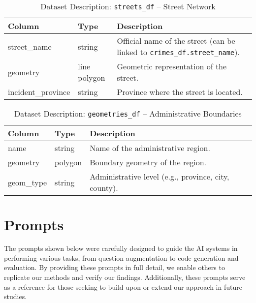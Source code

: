 \begin{table}[H]
\centering
\scriptsize
\begin{tabular}{|l|l|p{8cm}|}
  \hline
  \textbf{Column} & \textbf{Type} & \textbf{Description} \\
\hline
street\_name & string & Official name of the street (can be linked to \texttt{crimes\_df.street\_name}). \\
geometry & line polygon & Geometric representation of the street. \\
incident\_province & string & Province where the street is located. \\
\hline
\end{tabular}
\caption{Dataset Description: \texttt{streets\_df} – Street Network}
\end{table}


\begin{table}[H]
\centering
\scriptsize
\begin{tabular}{|l|l|p{8cm}|}
  \hline
  \textbf{Column} & \textbf{Type} & \textbf{Description} \\
  \hline
name & string & Name of the administrative region. \\
geometry & polygon & Boundary geometry of the region. \\
geom\_type & string & Administrative level (e.g., province, city, county). \\
\hline
\end{tabular}
\caption{Dataset Description: \texttt{geometries\_df} – Administrative Boundaries}
\end{table}



\clearpage
\section{Prompts}
\label{appendix:prompts}

The prompts shown below were carefully designed to guide the AI systems in performing various tasks, from question augmentation to code generation and evaluation. By providing these prompts in full detail, we enable others to replicate our methods and verify our findings. Additionally, these prompts serve as a reference for those seeking to build upon or extend our approach in future studies. \\

